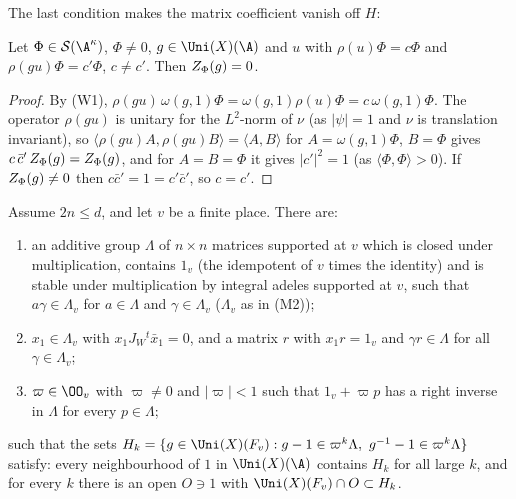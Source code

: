 The last condition makes the matrix coefficient vanish off $H$:

\begin{lemma}[Orthogonality]\label{pf:tlift:orth}
Let $\Phi\in\tliftS(\A^\kappa)$, $\Phi\ne0$, $g\in\Uni(X)(\A)$ and $u$ with $\rho(u)\Phi=c\Phi$ and $\rho(gu)\Phi=c'\Phi$, $c\ne c'$. Then
$Z_\Phi(g)=0$.
\end{lemma}

\begin{proof}
By (W1), $\rho(gu)\,\omega(g,1)\Phi=\omega(g,1)\rho(u)\Phi=c\,\omega(g,1)\Phi$. The operator $\rho(gu)$ is unitary for the
$L^2$-norm of $\nu$ (as $|\psi|=1$ and $\nu$ is translation invariant), so
$\langle\rho(gu)A,\rho(gu)B\rangle=\langle A,B\rangle$ for $A=\omega(g,1)\Phi$, $B=\Phi$ gives $c\,\bar c'\,Z_\Phi(g)=Z_\Phi(g)$, and for
$A=B=\Phi$ it gives $|c'|^2=1$ (as $\langle\Phi,\Phi\rangle>0$). If $Z_\Phi(g)\ne0$ then $c\bar c'=1=c'\bar c'$, so $c=c'$.
\end{proof}

\begin{lemma}\label{pf:tlift:latdatum}
Assume $2n\le d$, and let $v$ be a finite place. There are:
\begin{enumerate}[label=(\roman*),nosep]
\item an additive group $\Lambda$ of $n\times n$ matrices supported at $v$ which is closed under multiplication, contains
  $1_v$ (the idempotent of $v$ times the identity) and is stable under multiplication by integral adeles supported at
  $v$, such that $a\gamma\in\Lambda_v$ for $a\in\Lambda$ and $\gamma\in\Lambda_v$ ($\Lambda_v$ as in (M2));
\item $x_1\in\Lambda_v$ with $x_1J_W{}^t\bar x_1=0$, and a matrix $r$ with $x_1r=1_v$ and $\gamma r\in\Lambda$ for all $\gamma\in\Lambda_v$;
\item $\varpi\in\OO_v$ with $\varpi\ne0$ and $|\varpi|<1$ such that $1_v+\varpi p$ has a right inverse in $\Lambda$ for every $p\in\Lambda$;
\end{enumerate}
such that the sets $H_k=\{g\in\Uni(X)(F_v):g-1\in\varpi^k\Lambda,\ g^{-1}-1\in\varpi^k\Lambda\}$ satisfy: every neighbourhood of $1$ in
$\Uni(X)(\A)$ contains $H_k$ for all large $k$, and for every $k$ there is an open $O\ni1$ with $\Uni(X)(F_v)\cap O\subset H_k$.
\end{lemma}

